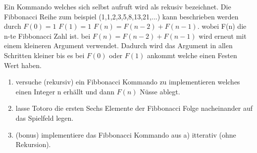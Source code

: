 \begin{Infobox}[Rekursion]
Ein Kommando welches sich selbst aufruft wird als rekusiv bezeichnet. Die Fibbonacci Reihe zum beispiel (1,1,2,3,5,8,13,21,...) kann beschrieben werden durch $F(0)=1$ $F(1)=1$ $F(n)=F(n-2)+F(n-1)$. wobei F(n) die n-te Fibbonacci Zahl ist. bei $F(n)=F(n-2)+F(n-1)$ wird erneut mit einem kleineren Argument verwendet. Dadurch wird das Argument in allen Schritten kleiner bis es bei $F(0)$ oder $F(1)$ ankommt welche einen Festen Wert haben.
\end{Infobox}
\begin{enumerate}
\item versuche (rekursiv) ein Fibbonacci Kommando zu implementieren welches einen Integer n erhällt und dann $F(n)$ Nüsse ablegt.
\item lasse Totoro die ersten Sechs Elemente der Fibbonacci Folge nacheinander auf das Spielfeld legen.
\item (bonus) implementiere das Fibbonacci Kommando aus a) itterativ (ohne Rekursion).  
\end{enumerate}
